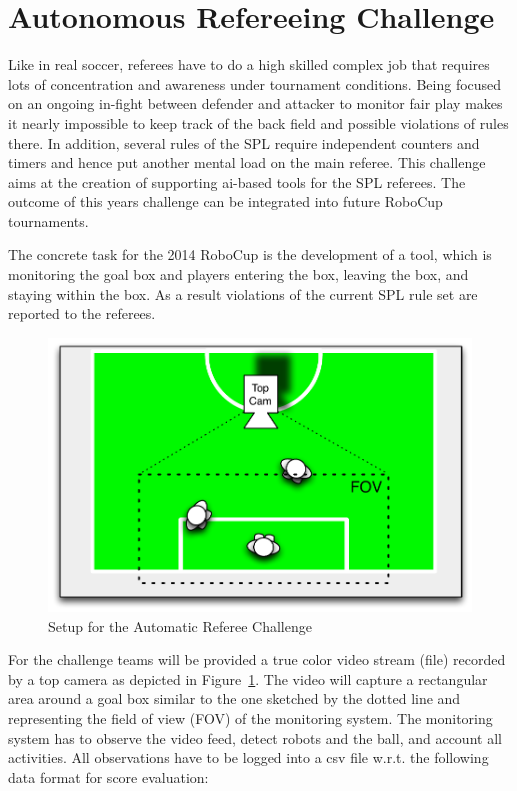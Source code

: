 \documentclass[12pt]{article}
\begin{document}
\newpage






\section{Autonomous Refereeing Challenge}

Like in real soccer, referees have to do a high skilled complex job that requires lots of concentration and awareness under tournament conditions. Being focused on an ongoing in-fight between defender and attacker to monitor fair play makes it nearly impossible to keep track of the back field and possible violations of rules there. In addition, several rules of the SPL require independent counters and timers and hence put another mental load on the main referee. This challenge aims at the creation of supporting ai-based tools for the SPL referees. The outcome of this years challenge can be integrated into future RoboCup tournaments.

The concrete task for the 2014 RoboCup is the development of a tool, which is monitoring the goal box and players entering the box, leaving the box, and staying within the box. As a result violations of the current SPL rule set are reported to the referees.

\begin{figure}[th!]
\centerline{\includegraphics[width=0.65\columnwidth]{figures/refmon}}
\caption{Setup for the Automatic Referee Challenge}
\label{fig:referee_challenge}
\end{figure}

For the challenge teams will be provided a true color video stream (file) recorded by a top camera as depicted in Figure~\ref{fig:referee_challenge}. The video will capture a rectangular area around a goal box similar to the one sketched by the dotted line and representing the field of view (FOV) of the monitoring system. The monitoring system has to observe the video feed, detect robots and the ball, and account all activities. All observations have to be logged into a csv file w.r.t. the following data format for score evaluation:
\end{document}
